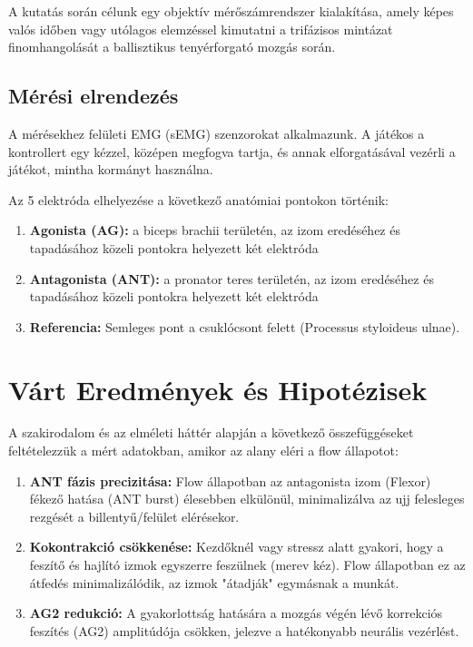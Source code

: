 A kutatás során célunk egy objektív mérőszámrendszer kialakítása, amely képes valós időben vagy utólagos elemzéssel kimutatni a trifázisos mintázat finomhangolását a ballisztikus tenyérforgató mozgás során.

\subsection{Mérési elrendezés}
A mérésekhez felületi EMG (sEMG) szenzorokat alkalmazunk. A játékos a kontrollert egy kézzel, középen megfogva tartja, és annak elforgatásával vezérli a játékot, mintha kormányt használna.

Az 5 elektróda elhelyezése a következő anatómiai pontokon történik:
\begin{enumerate}
    \item \textbf{Agonista (AG):} a biceps brachii területén, az izom eredéséhez és tapadásához közeli pontokra helyezett két elektróda
    \item \textbf{Antagonista (ANT):} a pronator teres területén, az izom eredéséhez és tapadásához közeli pontokra helyezett két elektróda
    \item \textbf{Referencia:} Semleges pont a csuklócsont felett (Processus styloideus ulnae).
\end{enumerate}


\section{Várt Eredmények és Hipotézisek}

A szakirodalom és az elméleti háttér alapján a következő összefüggéseket feltételezzük a mért adatokban, amikor az alany eléri a flow állapotot:

\begin{enumerate}
    \item \textbf{ANT fázis precizitása:} Flow állapotban az antagonista izom (Flexor) fékező hatása (ANT burst) élesebben elkülönül, minimalizálva az ujj felesleges rezgését a billentyű/felület elérésekor.
    \item \textbf{Kokontrakció csökkenése:} Kezdőknél vagy stressz alatt gyakori, hogy a feszítő és hajlító izmok egyszerre feszülnek (merev kéz). Flow állapotban ez az átfedés minimalizálódik, az izmok "átadják" egymásnak a munkát.
    \item \textbf{AG2 redukció:} A gyakorlottság hatására a mozgás végén lévő korrekciós feszítés (AG2) amplitúdója csökken, jelezve a hatékonyabb neurális vezérlést.
\end{enumerate}

